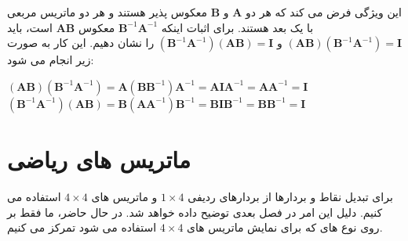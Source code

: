 {\begin{spacing}{1.5}
        این ویژگی فرض می کند که هر دو $\textbf{A}$ و $\textbf{B}$ معکوس پذیر هستند و هر دو ماتریس مربعی با یک بعد هستند.
        برای اثبات اینکه $\textbf{B}^{-1}\textbf{A}^{-1}$ معکوس $\textbf{AB}$ است، باید $(\textbf{AB})(\textbf{B}^{-1}\textbf{A}^{-1})=\textbf{I}$ و $(\textbf{B}^{-1}\textbf{A}^{-1})(\textbf{AB})=\textbf{I}$ را نشان دهیم.
        این کار به صورت زیر انجام می شود:

        \begin{center}
            $(\textbf{AB})(\textbf{B}^{-1}\textbf{A}^{-1})=\textbf{A}(\textbf{B}\textbf{B}^{-1})\textbf{A}^{-1}=\textbf{A}\textbf{I}\textbf{A}^{-1}=\textbf{A}\textbf{A}^{-1}=\textbf{I}$\\
            $(\textbf{B}^{-1}\textbf{A}^{-1})(\textbf{AB})=\textbf{B}(\textbf{A}\textbf{A}^{-1})\textbf{B}^{-1}=\textbf{B}\textbf{I}\textbf{B}^{-1}=\textbf{B}\textbf{B}^{-1}=\textbf{I}$\\
        \end{center}
    \end{spacing}
}


\section{\textbf{ماتریس های ریاضی }}
\label{sec:2.8}
{
    \Large
    \begin{spacing}{1.5}
        برای تبدیل نقاط و بردارها از بردارهای ردیفی $1\times 4$ و ماتریس های $4\times 4$ استفاده می کنیم.
        دلیل این امر در فصل بعدی توضیح داده خواهد شد.
        در حال حاضر، ما فقط بر روی نوع های  که برای نمایش ماتریس های $4\times 4$ استفاده می شود تمرکز می کنیم.
    \end{spacing}
}


